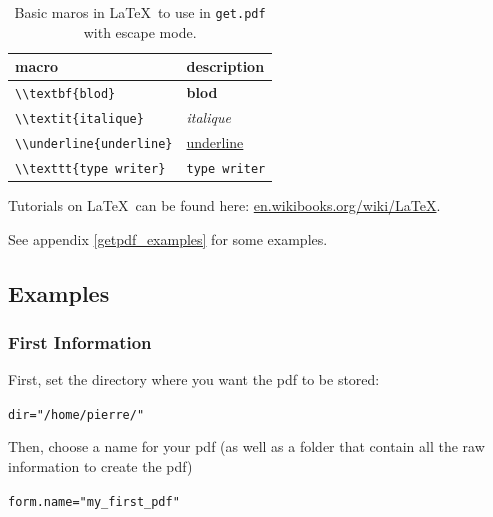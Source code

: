 \documentclass{article}\usepackage[]{graphicx}\usepackage[]{color}
\makeatletter
\newcommand{\hlstr}[1]{\textcolor[rgb]{0.192,0.494,0.8}{#1}}%
\newcommand{\hlstd}[1]{\textcolor[rgb]{0.345,0.345,0.345}{#1}}%
\newcommand{\hlkwb}[1]{\textcolor[rgb]{0.69,0.353,0.396}{#1}}%
\newenvironment{kframe}{%
 \def\at@end@of@kframe{}%
 \ifinner\ifhmode%
  \def\at@end@of@kframe{\end{minipage}}%
  \begin{minipage}{\columnwidth}%
 \fi\fi%
 \def\FrameCommand##1{\hskip\@totalleftmargin \hskip-\fboxsep
 \colorbox{shadecolor}{##1}\hskip-\fboxsep
     \hskip-\linewidth \hskip-\@totalleftmargin \hskip\columnwidth}%
 \MakeFramed {\advance\hsize-\width
   \@totalleftmargin\z@ \linewidth\hsize
   \@setminipage}}%
 {\par\unskip\endMakeFramed%
 \at@end@of@kframe}
\newenvironment{knitrout}{}{} %
\makeatother
\begin{document}
\begin{table}[H]
\begin{center}
\begin{tabular}{ll}
\hline
macro & description \\
\hline
\verb|\\textbf{blod}| & \textbf{blod} \\
\hline
\verb|\\textit{italique}| & \textit{italique} \\
\hline
\verb|\\underline{underline}| & \underline{underline} \\
\hline
\verb|\\texttt{type writer}| & \texttt{type writer} \\
\hline
\end{tabular}
\caption{Basic maros in \LaTeX~to use in \texttt{get.pdf} with escape mode.}
\label{macros}
\end{center}
\end{table}


Tutorials on \LaTeX~can be found here: \url{en.wikibooks.org/wiki/LaTeX}.

See appendix \ref{getpdf_examples} for some examples.

\subsection{Examples}

\subsubsection{First Information}
First, set the directory where you want the pdf to be stored:
\begin{knitrout}
\color{fgcolor}\begin{kframe}
\begin{alltt}
\hlstd{dir} \hlkwb{=} \hlstr{"/home/pierre/"}
\end{alltt}
\end{kframe}
\end{knitrout}

Then, choose a name for your pdf (as well as a folder that contain all the raw information to create the pdf) 
\begin{knitrout}
\color{fgcolor}\begin{kframe}
\begin{alltt}
\hlstd{form.name} \hlkwb{=} \hlstr{"my_first_pdf"}
\end{alltt}
\end{kframe}
\end{knitrout}
\end{document}
